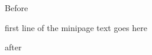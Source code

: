 \documentclass[12pt]{article}
\begin{document}
Before \begin{minipage}[t]{4cm}first line of the minipage text goes here\end{minipage} after
\end{document}
